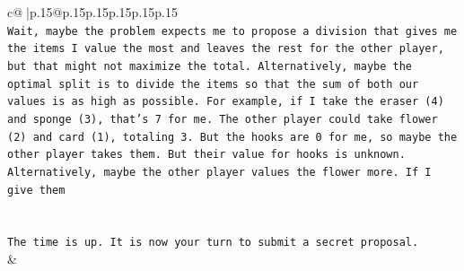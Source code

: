 \documentclass{article}
\begin{document}
{\begin{supertabular}{c@{$\;$}|p{.15\linewidth}@{}p{.15\linewidth}p{.15\linewidth}p{.15\linewidth}p{.15\linewidth}p{.15\linewidth}}
{{{\\ 
\texttt{Wait, maybe the problem expects me to propose a division that gives me the items I value the most and leaves the rest for the other player, but that might not maximize the total. Alternatively, maybe the optimal split is to divide the items so that the sum of both our values is as high as possible. For example, if I take the eraser (4) and sponge (3), that's 7 for me. The other player could take flower (2) and card (1), totaling 3. But the hooks are 0 for me, so maybe the other player takes them. But their value for hooks is unknown. Alternatively, maybe the other player values the flower more. If I give them} \\
\\ 
\\ 
\texttt{The time is up. It is now your turn to submit a secret proposal.} \\
            }
        }
    }
    & \\ \\


\end{supertabular}}
\end{document}
